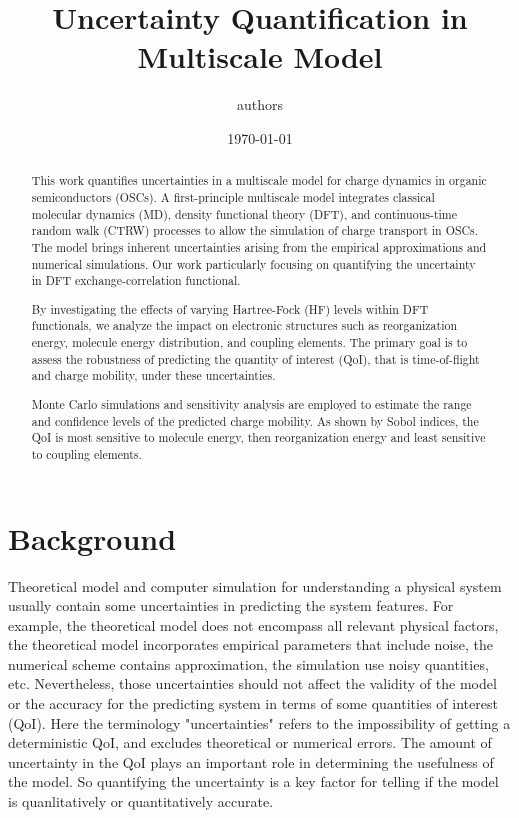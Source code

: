 \documentclass[letterpaper,12pt]{article}
\begin{document}
\linenumbers
\title{Uncertainty Quantification in Multiscale Model }
\author{authors}
\date{\today}
\maketitle
\begin{abstract}
    This work quantifies uncertainties in a multiscale model for charge dynamics in organic semiconductors (OSCs). A first-principle multiscale model integrates classical molecular dynamics (MD), density functional theory (DFT), and continuous-time random walk (CTRW) processes to allow the simulation of charge transport in OSCs. The model brings inherent uncertainties arising from the empirical approximations and numerical simulations. Our work particularly focusing on quantifying the uncertainty in DFT exchange-correlation functional.

    By investigating the effects of varying Hartree-Fock (HF) levels within DFT functionals, we analyze the impact on electronic structures such as reorganization energy, molecule energy distribution, and coupling elements. The primary goal is to assess the robustness of predicting the quantity of interest (QoI), that is time-of-flight and charge mobility, under these uncertainties.
    
    Monte Carlo simulations and sensitivity analysis are employed to estimate the range and confidence levels of the predicted charge mobility. As shown by Sobol indices, the QoI is most sensitive to molecule energy, then reorganization energy and least sensitive to coupling elements.  
\end{abstract}

\section{Background}

Theoretical model and computer simulation for understanding a physical system usually contain some uncertainties in predicting the system features. 
For example, the theoretical model does not encompass all relevant physical factors, the theoretical model incorporates empirical parameters that include noise, the numerical scheme contains approximation, the simulation use noisy quantities, etc.
Nevertheless, those uncertainties should not affect the validity of the model or the accuracy for the predicting system in terms of some quantities of interest (QoI). 
Here the terminology "uncertainties" refers to the impossibility of getting a deterministic QoI, and excludes theoretical or numerical errors. 
The amount of uncertainty in the QoI plays an important role in determining the usefulness of the model. 
So quantifying the uncertainty is a key factor for telling if the model is quanlitatively or quantitatively accurate. 
\end{document}
